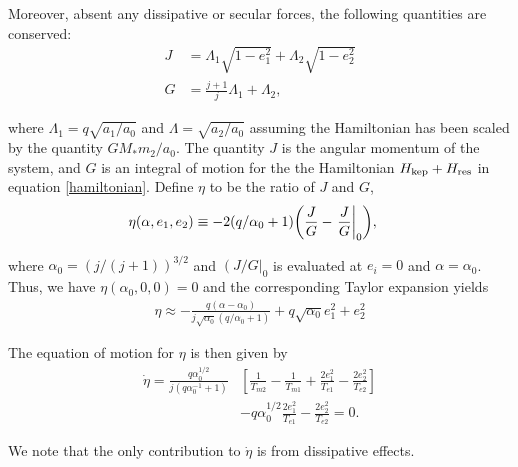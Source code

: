 \documentclass[usenatbib]{mnras}
\DeclarePairedDelimiter{\p}{(}{)}
\begin{document}
Moreover, absent any dissipative or secular forces, the following quantities are
conserved:
\begin{align}
  J &= \Lambda_1\sqrt{1-e_1^2} + \Lambda_2\sqrt{1-e_2^2}\\
  G &= \frac{j+1}{j} \Lambda_1 + \Lambda_2,
\end{align}

\noindent where \(\Lambda_1 = q\sqrt{a_1/a_0}\) and
\(\Lambda=\sqrt{a_2/a_0}\) assuming the Hamiltonian has been scaled by
the quantity \(GM_*m_2/a_0\).  The quantity \(J\) is the angular momentum
of the system, and \(G\) is an integral of motion for the the
Hamiltonian \(H_{\rm kep}+H_{\rm res}\) in equation \eqref{hamiltonian}.
Define \(\eta\) to be the ratio of \(J\) and \(G\),
\begin{align}
  \eta(\alpha, e_1, e_2) &\equiv - 2(q/\alpha_0+1)\p*{\frac{J}{G}-\left.\frac{J}{G}\right|_{0}},
\end{align}

\noindent
where \(\alpha_0 = (j/(j+1))^{3/2}\) and \(\left(J/G\right|_{0}\) is
evaluated at \(e_i=0\) and \(\alpha=\alpha_0\).
Thus, we have \(\eta(\alpha_0, 0, 0)=0\) and the corresponding Taylor expansion yields
\begin{align}
  \eta \approx -\frac{q(\alpha-\alpha_0)}{j\sqrt{\alpha_0}(q/\alpha_0+1)} + q\sqrt{\alpha_0}e_1^2 + e_2^2
\end{align}

\noindent
The equation of motion for \(\eta\) is then given by
\begin{align}
\label{doteta}
  \dot\eta = \frac{q\alpha_0^{1/2}}{j(q\alpha_0^{-1}+1)}&\left[ \frac{1}{T_{m2}} - \frac{1}{T_{m1}}
      + \frac{2e_1^2}{T_{e1}}- \frac{2e_2^2}{T_{e2}} \right] \nonumber\\
    &- q\alpha_0^{1/2}\frac{2e_1^2}{T_{e1}} - \frac{2e_2^2}{T_{e2}}=0.
\end{align}

\noindent
We note that the only contribution to \(\dot{\eta}\) is from dissipative effects.
\end{document}

